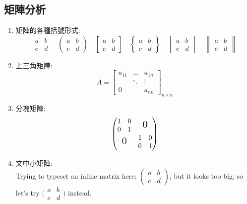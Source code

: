 \subsection{矩陣分析}
\begin{enumerate}
\item
矩陣的各種括號形式:
\vspace{0.2cm}
\[
\begin{matrix} 
a & b \\
c & d 
\end{matrix}
\quad
\begin{pmatrix} 
a & b \\
c & d 
\end{pmatrix}
\quad
\begin{bmatrix} 
a & b \\
c & d 
\end{bmatrix}
\quad
\begin{Bmatrix} 
a & b \\
c & d 
\end{Bmatrix}
\quad
\begin{vmatrix} 
a & b \\
c & d 
\end{vmatrix}
\quad
\begin{Vmatrix} 
a & b \\
c & d 
\end{Vmatrix}
\]

\item
上三角矩陣:
\vspace{0.5cm}
\[
A = \begin{bmatrix}
a_{11} & \dots  & a_{1n}\\
       & \ddots & \vdots\\
0      &        & a_{nn}
\end{bmatrix}_{n \times n}
\]

\item
分塊矩陣:
\vspace{0.5cm}
\[
\begin{pmatrix}
\begin{matrix} 1&0\\0&1 \end{matrix} & \text{\Large 0}\\
\text{\Large 0}                      & \begin{matrix} 1&0\\0&1 \end{matrix}
\end{pmatrix}
\]

\item
文中小矩陣:\\
Trying to typeset an inline matrix here:
 $\begin{pmatrix}
  a & b\\ 
  c & d
\end{pmatrix}$,  
but it looks too big, so let's try 
$\big(\begin{smallmatrix}
  a & b\\
  c & d
\end{smallmatrix}\big)$ 
instead.


\end{enumerate}
